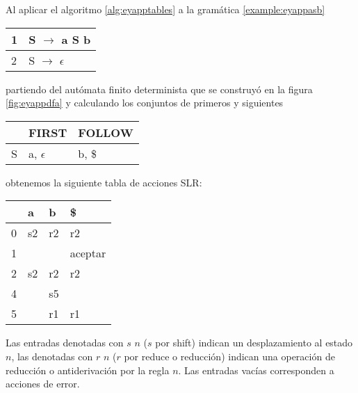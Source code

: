 \begin{example}
\label{example:eyapptablasslr}
Al aplicar el algoritmo \ref{alg:eyapptables}       
a la gramática \ref{example:eyappasb} 

\vspace{0.5cm}
\begin{center}
\begin{tabular}{|l|l|}
\hline
1 & S      $\rightarrow$  a S b\\
\hline
2 & S      $\rightarrow$ $\epsilon$ \\
\hline
\end{tabular}
\end{center}
\vspace{0.25cm}

partiendo del autómata finito determinista
que se construyó en 
la figura \ref{fig:eyappdfa} y calculando los 
conjuntos de primeros y siguientes

\begin{center}
\begin{tabular}{|l|l|l|}
\hline
     & FIRST  & FOLLOW \\
\hline
S    & a, $\epsilon$ & b, \$\\
\hline
\end{tabular}
\end{center}

obtenemos la siguiente tabla de acciones SLR:

\begin{center}
\begin{tabular}{|l|l|l|l|}
\hline
     &  a  &  b  & \$ \\
\hline
0    & s2  &  r2 & r2 \\
\hline
1    &     &     & aceptar\\
\hline
2    & s2  & r2  & r2\\
\hline
4    &     & s5  &   \\
\hline
5    &     & r1  & r1\\
\hline
\end{tabular}
\end{center}

Las entradas denotadas con $s$ $n$ ($s$ por shift) indican un desplazamiento
al estado $n$, las denotadas con $r$ $n$ ($r$ por reduce o reducción) indican una operación
de reducción o antiderivación por la regla $n$.  Las entradas vacías 
corresponden a acciones de error.
\end{example}


